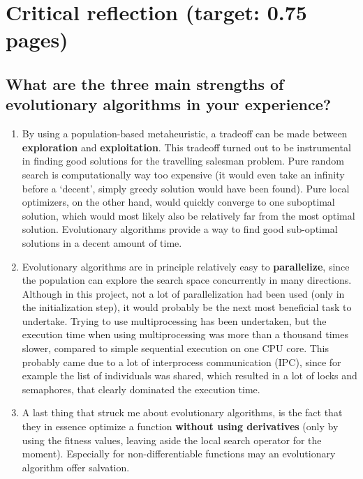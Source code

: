 \documentclass[a4paper,10pt]{article}
\newcommand{\RemoveMe}[1]{{\color{purple}#1}}
\begin{document}
\section{Critical reflection (target: 0.75 pages)}


\subsection{What are the three main strengths of evolutionary algorithms in your experience?}

\begin{enumerate}
 \item By using a population-based metaheuristic, a tradeoff can be made between \textbf{exploration} and \textbf{exploitation}. This tradeoff turned out to be instrumental in finding good solutions for the travelling salesman problem. Pure random search is computationally way too expensive (it would even take an infinity before a `decent', simply greedy solution would have been found). Pure local optimizers, on the other hand, would quickly converge to one suboptimal solution, which would most likely also be relatively far from the most optimal solution. Evolutionary algorithms provide a way to find good sub-optimal solutions in a decent amount of time.
 \item Evolutionary algorithms are in principle relatively easy to \textbf{parallelize}, since the population can explore the search space concurrently in many directions. Although in this project, not a lot of parallelization had been used (only in the initialization step), it would probably be the next most beneficial task to undertake. Trying to use multiprocessing has been undertaken, but the execution time when using multiprocessing was more than a thousand times slower, compared to simple sequential execution on one CPU core. This probably came due to a lot of interprocess communication (IPC), since for example the list of individuals was shared, which resulted in a lot of locks and semaphores, that clearly dominated the execution time.
 \item A last thing that struck me about evolutionary algorithms, is the fact that they in essence optimize a function \textbf{without using derivatives} (only by using the fitness values, leaving aside the local search operator for the moment). Especially for non-differentiable functions may an evolutionary algorithm offer salvation.
\end{enumerate}
\end{document}
